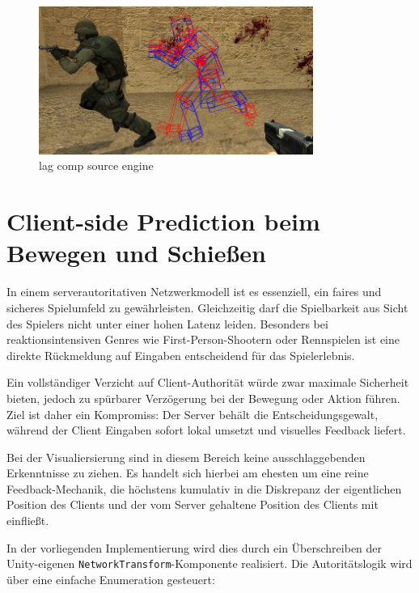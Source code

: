 \begin{figure}[H] %
    \centering
    \includegraphics[width=0.8\textwidth]{figures/lag_comp_valve.png}
    \caption{lag comp source engine}
    \label{fig:lag comp}
\end{figure}


\section{Client-side Prediction beim Bewegen und Schießen}
\label{client side prediction}

In einem serverautoritativen Netzwerkmodell ist es essenziell, ein faires und sicheres Spielumfeld zu gewährleisten. Gleichzeitig darf die Spielbarkeit aus Sicht des Spielers nicht unter einer hohen Latenz leiden. Besonders bei reaktionsintensiven Genres wie First-Person-Shootern oder Rennspielen ist eine direkte Rückmeldung auf Eingaben entscheidend für das Spielerlebnis.

Ein vollständiger Verzicht auf Client-Authorität würde zwar maximale Sicherheit bieten, jedoch zu spürbarer Verzögerung bei der Bewegung oder Aktion führen. Ziel ist daher ein Kompromiss: Der Server behält die Entscheidungsgewalt, während der Client Eingaben sofort lokal umsetzt und visuelles Feedback liefert.

Bei der Visualiersierung sind in diesem Bereich keine ausschlaggebenden Erkenntnisse zu ziehen. Es handelt sich hierbei am ehesten um eine reine Feedback-Mechanik, die höchstens kumulativ in die Diskrepanz der eigentlichen Position des Clients und der vom Server gehaltene Position des Clients mit einfließt. 


\newpage
In der vorliegenden Implementierung wird dies durch ein Überschreiben der Unity-eigenen \texttt{NetworkTransform}-Komponente realisiert. Die Autoritätslogik wird über eine einfache Enumeration gesteuert:





